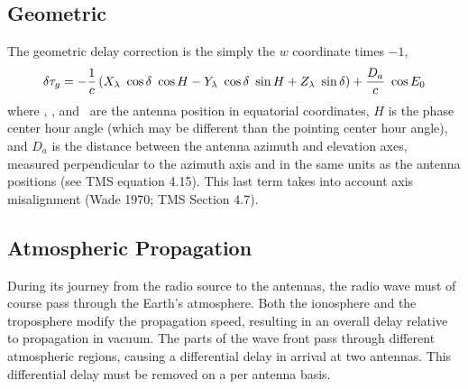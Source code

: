 \documentclass[preprint]{aastex}
\newcommand{\xlam}{
   \ifmmode{X_\lambda}
   \else{$X_\lambda$}
   \fi}
\newcommand{\ylam}{
   \ifmmode{Y_\lambda}
   \else{$Y_\lambda$}
   \fi}
\newcommand{\zlam}{
   \ifmmode{Z_\lambda}
   \else{$Z_\lambda$}
   \fi}
\begin{document}
\subsection{Geometric\label{s-geometric}}
The geometric delay correction is the simply the $w$ coordinate times $-1$,
\begin{equation}
 \delta\tau_g = - \frac{1}{c} \left( \xlam~\cos\delta~\cos H - 
                    \ylam~\cos\delta~\sin H +
                    \zlam~\sin\delta \right) +
                    \frac{D_a}{c}~\cos E_0
\end{equation}
\noindent where \xlam, \ylam, and \zlam\ are the antenna position
in equatorial coordinates, $H$ is the phase center hour angle (which
may be different than the pointing center hour angle), and 
$D_a$ is the distance between the antenna azimuth and elevation axes, 
measured perpendicular to the azimuth axis and in the same units 
as the antenna positions (see TMS equation 4.15). This last term takes 
into account axis misalignment (Wade 1970; TMS Section 4.7).

\subsection{Atmospheric Propagation\label{s-atmosdelay}}
During its journey from the radio source to the antennas, the
radio wave must of course pass through the Earth's atmosphere.  Both the
ionosphere and the troposphere modify the propagation speed, resulting in
an overall delay relative to propagation in vacuum.  The parts of the wave
front pass through different atmospheric regions, causing a differential
delay in arrival at two antennas.  This differential delay must
be removed on a per antenna basis.
\end{document}

